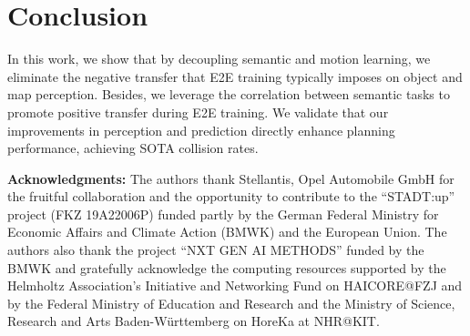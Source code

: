 \section{Conclusion}
\label{sec:conclusion}

In this work, we show that by decoupling semantic and motion learning, we eliminate the negative transfer that \gls{E2E} training typically imposes on object and map perception. 
Besides, we leverage the correlation between semantic tasks to promote positive transfer during \gls{E2E} training. We validate that our improvements in perception and prediction directly enhance planning performance, achieving SOTA collision rates.

\newpage
{
\textbf{Acknowledgments: }The authors thank Stellantis, Opel Automobile GmbH for the fruitful collaboration and the opportunity to contribute to the ``STADT:up'' project (FKZ 19A22006P) funded partly by the German Federal Ministry for Economic Affairs and Climate Action (BMWK) and the European Union.
The authors also thank the project ``NXT GEN AI METHODS'' funded by the BMWK and gratefully acknowledge the computing resources supported by the Helmholtz Association's Initiative and Networking Fund on HAICORE@FZJ and by the Federal Ministry of Education and Research and the Ministry of Science, Research and Arts \mbox{Baden-Württemberg} on HoreKa at NHR@KIT.
}
